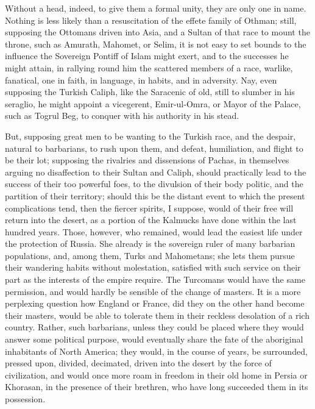 Without a head, indeed, to
give them a formal unity, they are only one in name. Nothing is less
likely than a resuscitation of the effete family of Othman; still,
supposing the Ottomans driven into Asia, and a Sultan of that race to
mount the throne, such as Amurath, Mahomet, or Selim, it is not easy
to set bounds to the influence the Sovereign Pontiff of Islam might
exert, and to the successes he might attain, in rallying round him the
scattered members of a race, warlike, fanatical, one in faith, in
language, in habits, and in adversity. Nay, even supposing the Turkish
Caliph, like the Saracenic of old, still to slumber in his seraglio,
he might appoint a vicegerent, Emir-ul-Omra, or Mayor of the Palace,
such as Togrul Beg, to conquer with his authority in his stead.

But, supposing great men to be
wanting to the Turkish race, and the despair, natural to
barbarians, to rush upon them, and defeat, humiliation, and flight to
be their lot; supposing the rivalries and dissensions of Pachas, in
themselves arguing no disaffection to their Sultan and Caliph, should
practically lead to the success of their too powerful foes, to the
divulsion of their body politic, and the partition of their territory;
should this be the distant event to which the present complications
tend, then the fiercer spirits, I suppose, would of their free will
return into the desert, as a portion of the Kalmucks have done within
the last hundred years. Those, however, who remained, would lead the
easiest life under the protection of Russia. She already is the
sovereign ruler of many barbarian populations, and, among them, Turks
and Mahometans; she lets them pursue their wandering habits without
molestation, satisfied with such service on their part as the
interests of the empire require. The Turcomans would have the same
permission, and would hardly be sensible of the change of masters. It
is a more perplexing question how England or France, did they on the
other hand become their masters, would be able to tolerate them in
their reckless desolation of a rich country. Rather, such barbarians,
unless they could be placed where they would answer some political
purpose, would eventually share the fate of the aboriginal inhabitants
of North America; they would, in the course of years, be surrounded,
pressed upon, divided, decimated, driven into the desert by the force
of civilization, and would once more roam in freedom in their old home
in Persia or Khorasan, in the presence of their brethren, who have
long succeeded them in its possession.


